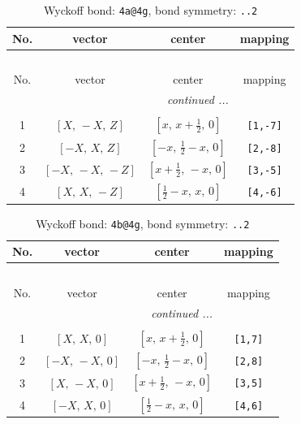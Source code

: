 \documentclass[fleqn,8pt]{jsarticle}
\begin{document}
\begin{longtable}{cccc}
\caption{Wyckoff bond: {\tt 4a@4g}, bond symmetry: {\tt ..2}}
 \\
 \hline \hline
No. & vector & center & mapping \\ \hline \endfirsthead

\multicolumn{3}{l}{\tablename\ \thetable{}} \\
 \hline \hline
No. & vector & center & mapping \\ \hline \endhead

 \hline \hline
\multicolumn{3}{r}{\footnotesize\it continued ...} \\ \endfoot

 \hline \hline
\multicolumn{3}{r}{} \\ \endlastfoot

1 & $\left[ X,\, - X,\, Z \right]$ & $\left[ x,\, x + \frac{1}{2},\, 0 \right]$ & {\tt [1,-7]} \\ \hline
2 & $\left[ - X,\, X,\, Z \right]$ & $\left[ - x,\, \frac{1}{2} - x,\, 0 \right]$ & {\tt [2,-8]} \\ \hline
3 & $\left[ - X,\, - X,\, - Z \right]$ & $\left[ x + \frac{1}{2},\, - x,\, 0 \right]$ & {\tt [3,-5]} \\ \hline
4 & $\left[ X,\, X,\, - Z \right]$ & $\left[ \frac{1}{2} - x,\, x,\, 0 \right]$ & {\tt [4,-6]} \\
\end{longtable}
\renewcommand{\arraystretch}{1.2}
\begin{longtable}{cccc}
\caption{Wyckoff bond: {\tt 4b@4g}, bond symmetry: {\tt ..2}}
 \\
 \hline \hline
No. & vector & center & mapping \\ \hline \endfirsthead

\multicolumn{3}{l}{\tablename\ \thetable{}} \\
 \hline \hline
No. & vector & center & mapping \\ \hline \endhead

 \hline \hline
\multicolumn{3}{r}{\footnotesize\it continued ...} \\ \endfoot

 \hline \hline
\multicolumn{3}{r}{} \\ \endlastfoot

1 & $\left[ X,\, X,\, 0 \right]$ & $\left[ x,\, x + \frac{1}{2},\, 0 \right]$ & {\tt [1,7]} \\ \hline
2 & $\left[ - X,\, - X,\, 0 \right]$ & $\left[ - x,\, \frac{1}{2} - x,\, 0 \right]$ & {\tt [2,8]} \\ \hline
3 & $\left[ X,\, - X,\, 0 \right]$ & $\left[ x + \frac{1}{2},\, - x,\, 0 \right]$ & {\tt [3,5]} \\ \hline
4 & $\left[ - X,\, X,\, 0 \right]$ & $\left[ \frac{1}{2} - x,\, x,\, 0 \right]$ & {\tt [4,6]} \\
\end{longtable}
\end{document}
